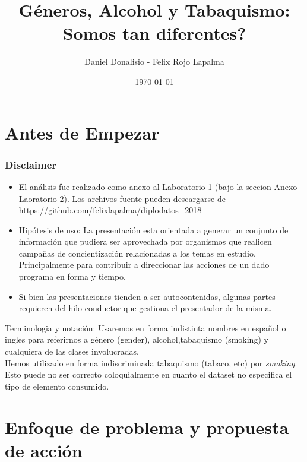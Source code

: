 \documentclass[8pt]{beamer}
\title{Géneros, Alcohol y Tabaquismo: Somos tan diferentes?}
\author{Daniel Donalisio - Felix Rojo Lapalma}
\date{\today}
\begin{document}
\begin{frame}
\titlepage
\end{frame}

\section{Antes de Empezar}
\begin{frame}\frametitle{Disclaimer}
\begin{itemize}
\item El análisis fue realizado como anexo al Laboratorio 1 (bajo la seccion Anexo - Laoratorio 2). Los archivos fuente
pueden descargarse de \url{https://github.com/felixlapalma/diplodatos_2018}  
\item Hipótesis de uso: La presentación esta orientada a generar un conjunto de información que pudiera ser aprovechada por organismos
que realicen campa\~nas de concientizaci\'on relacionadas a los temas en estudio. Principalmente para contribuir a direccionar 
las acciones de un dado programa en forma y tiempo.
\item Si bien las presentaciones tienden a ser autocontenidas, algunas partes requieren del hilo conductor que gestiona el presentador de la misma.
\end{itemize}
Terminologia y notación: Usaremos en forma indistinta nombres en español o ingles para referirnos a género (gender), alcohol,tabaquismo (smoking) y cualquiera de las clases involucradas. \\
Hemos utilizado en forma indiscriminada tabaquismo (tabaco, etc) por \textit{smoking}. Esto puede no ser correcto coloquialmente en cuanto el dataset no especifica el tipo de elemento consumido. 
\end{frame}

\section{Enfoque de problema y propuesta de acción}
\end{document}
